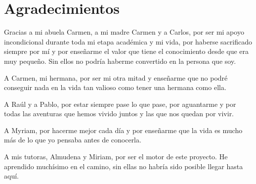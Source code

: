 \newpage{\ }
\thispagestyle{empty}
\chapter*{Agradecimientos}

\noindent Gracias a mi abuela Carmen, a mi madre Carmen y a Carlos, por ser mi apoyo incondicional durante toda mi etapa académica y mi vida, por haberse sacrificado siempre por mí y por enseñarme el valor que tiene el conocimiento desde que era muy pequeño. Sin ellos no podría haberme convertido en la persona que soy.

A Carmen, mi hermana, por ser mi otra mitad y enseñarme que no podré conseguir nada en la vida tan valioso como tener una hermana como ella.

A Raúl y a Pablo, por estar siempre pase lo que pase, por aguantarme y por todas las aventuras que hemos vivido juntos y las que nos quedan por vivir.

A Myriam, por hacerme mejor cada día y por enseñarme que la vida es mucho más de lo que yo pensaba antes de conocerla.

A mis tutoras, Almudena y Miriam, por ser el motor de este proyecto. He aprendido muchísimo en el camino, sin ellas no habría sido posible llegar hasta aquí.